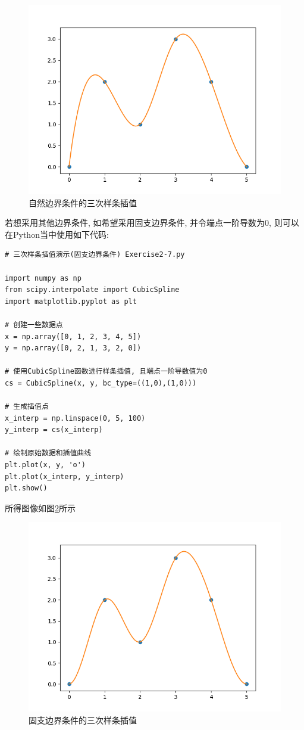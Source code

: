 \begin{figure}[h]
    \centering
    \includegraphics[width=1\linewidth]{Chapter2/graph/python/Figure2-5.png}
    \caption{自然边界条件的三次样条插值}
    \label{fig:自然边界条件三次样条插值}
\end{figure}

若想采用其他边界条件, 如希望采用固支边界条件, 并令端点一阶导数为0, 则可以在Python当中使用如下代码:

\begin{lstlisting}
# 三次样条插值演示(固支边界条件) Exercise2-7.py

import numpy as np
from scipy.interpolate import CubicSpline
import matplotlib.pyplot as plt

# 创建一些数据点
x = np.array([0, 1, 2, 3, 4, 5])
y = np.array([0, 2, 1, 3, 2, 0])

# 使用CubicSpline函数进行样条插值, 且端点一阶导数值为0
cs = CubicSpline(x, y, bc_type=((1,0),(1,0)))

# 生成插值点
x_interp = np.linspace(0, 5, 100)
y_interp = cs(x_interp)

# 绘制原始数据和插值曲线
plt.plot(x, y, 'o')
plt.plot(x_interp, y_interp)
plt.show()
\end{lstlisting}

所得图像如图\ref{fig:固支边界条件的三次样条插值}所示

\begin{figure}[h]
    \centering
    \includegraphics[width=1\linewidth]{Chapter2/graph/python/Figure2-6.png}
    \caption{固支边界条件的三次样条插值}
    \label{fig:固支边界条件的三次样条插值}
\end{figure}
